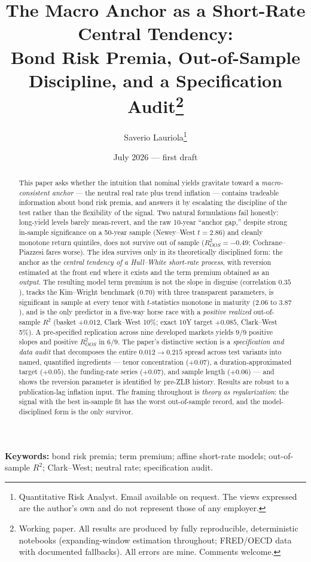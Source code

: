 \documentclass[11pt]{article}
\title{The Macro Anchor as a Short-Rate Central Tendency:\\
Bond Risk Premia, Out-of-Sample Discipline, and a Specification Audit\thanks{%
Working paper. All results are produced by fully reproducible, deterministic notebooks
(expanding-window estimation throughout; FRED/OECD data with documented fallbacks). All
errors are mine. Comments welcome.}}
\author{Saverio Lauriola\thanks{Quantitative Risk Analyst. Email available on request. The
views expressed are the author's own and do not represent those of any employer.}}
\date{July 2026 --- first draft}
\begin{document}
\maketitle

\begin{abstract}
\noindent
This paper asks whether the intuition that nominal yields gravitate toward a
\emph{macro-consistent anchor} --- the neutral real rate plus trend inflation --- contains
tradeable information about bond risk premia, and answers it by escalating the discipline of
the test rather than the flexibility of the signal. Two natural formulations fail honestly:
long-yield levels barely mean-revert, and the raw 10-year ``anchor gap,'' despite strong
in-sample significance on a 50-year sample (Newey--West $t=2.86$) and cleanly monotone
return quintiles, does not survive out of sample ($R^2_{OOS}=-0.49$; Cochrane--Piazzesi
fares worse). The idea survives only in its theoretically disciplined form: the anchor as
the \emph{central tendency of a Hull--White short-rate process}, with reversion estimated at
the front end where it exists and the term premium obtained as an \emph{output}. The
resulting model term premium is not the slope in disguise (correlation $0.35$), tracks the
Kim--Wright benchmark ($0.70$) with three transparent parameters, is significant in sample
at every tenor with $t$-statistics monotone in maturity ($2.06$ to $3.87$), and is the only
predictor in a five-way horse race with a \emph{positive realized} out-of-sample $R^2$
(basket $+0.012$, Clark--West 10\%; exact 10Y target $+0.085$, Clark--West 5\%). A
pre-specified replication across nine developed markets yields $9/9$ positive slopes and
positive $R^2_{OOS}$ in $6/9$. The paper's distinctive section is a \emph{specification and
data audit} that decomposes the entire $0.012\!\to\!0.215$ spread across test variants into
named, quantified ingredients --- tenor concentration ($+0.07$), a duration-approximated
target ($+0.05$), the funding-rate series ($+0.07$), and sample length ($+0.06$) --- and
shows the reversion parameter is identified by pre-ZLB history. Results are robust to a
publication-lag inflation input. The framing throughout is \emph{theory as regularization}:
the signal with the best in-sample fit has the worst out-of-sample record, and the
model-disciplined form is the only survivor.
\end{abstract}

\vspace{0.5em}
\noindent\textbf{Keywords:} bond risk premia; term premium; affine short-rate models;
out-of-sample $R^2$; Clark--West; neutral rate; specification audit.
\end{document}
